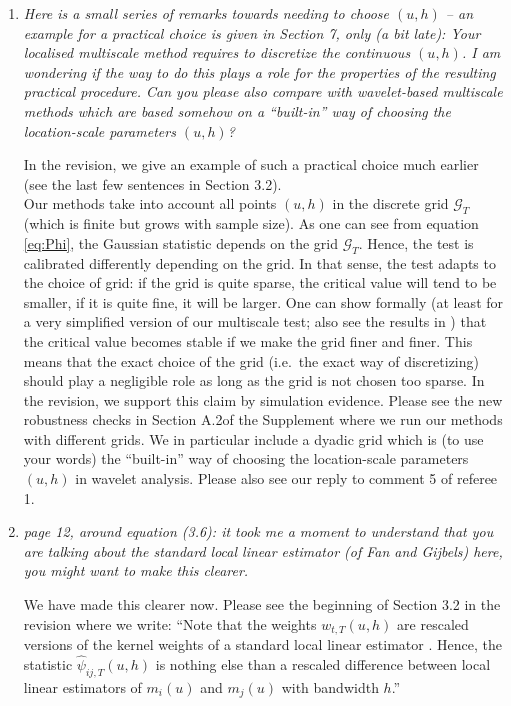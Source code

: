 \documentclass[a4paper,12pt]{article}
\begin{document}
\begin{enumerate}[label=\arabic*.,leftmargin=0.6cm]
\item \textit{Here is a small series of remarks towards needing to choose $(u, h)$ -- an example for a practical choice is given in Section 7, only (a bit late): Your localised multiscale method requires to discretize the continuous $(u, h)$. I am wondering if the way to do this plays a role for the properties of the resulting practical procedure. Can you please also compare with wavelet-based multiscale methods which are based somehow on a ``built-in'' way of choosing the location-scale parameters $(u, h)$?}  

In the revision, we give an example of such a practical choice much earlier (see the last few sentences in Section 3.2). \\
Our methods take into account all points $(u,h)$ in the discrete grid $\mathcal{G}_T$ (which is finite but grows with sample size). As one can see from equation \eqref{eq:Phi}, the Gaussian statistic depends on the grid $\mathcal{G}_T$. Hence, the test is calibrated differently depending on the grid. In that sense, the test adapts to the choice of grid: if the grid is quite sparse, the critical value will tend to be smaller, if it is quite fine, it will be larger. One can show formally (at least for a very simplified version of our multiscale test; also see the results in \cite{DuembgenSpokoiny2001}) that the critical value becomes stable if we make the grid finer and finer. This means that the exact choice of the grid (i.e.\ the exact way of discretizing) should play a negligible role as long as the grid is not chosen too sparse. In the revision, we support this claim by simulation evidence. Please see the new robustness checks in Section A.2of the Supplement where we run our methods with different grids. We in particular include a dyadic grid which is (to use your words) the ``built-in'' way of choosing the location-scale parameters $(u, h)$ in wavelet analysis. Please also see our reply to comment 5 of referee 1. 


\item \textit{page 12, around equation (3.6): it took me a moment to understand that you are talking about the standard local linear estimator (of Fan and Gijbels) here, you might want to make this clearer.}

We have made this clearer now. Please see the beginning of Section 3.2 in the revision where we write: ``Note that the weights $w_{t,T}(u,h)$ are rescaled versions of the kernel weights of a standard local linear estimator \citep{FanGijbels1996}. Hence, the statistic $\widehat{\psi}_{ij, T}(u, h)$ is nothing else than a rescaled difference between local linear estimators of $m_i(u)$ and $m_j(u)$ with bandwidth $h$.''    



\end{enumerate}
\end{document}

